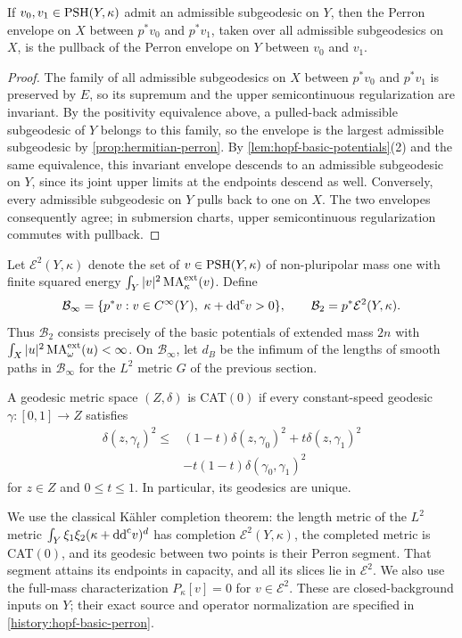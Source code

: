 \begin{proposition}\label{prop:hopf-basic-descent}
If $v_0,v_1\in\mathrm{PSH}(Y,\kappa)$ admit an admissible subgeodesic on $Y$, then the Perron envelope on $X$ between $p^*v_0$ and $p^*v_1$, taken over all admissible subgeodesics on $X$, is the pullback of the Perron envelope on $Y$ between $v_0$ and $v_1$.
\end{proposition}
\begin{proof}
The family of all admissible subgeodesics on $X$ between $p^*v_0$ and $p^*v_1$ is preserved by $E$, so its supremum and the upper semicontinuous regularization are invariant. By the positivity equivalence above, a pulled-back admissible subgeodesic of $Y$ belongs to this family, so the envelope is the largest admissible subgeodesic by \cref{prop:hermitian-perron}. By \cref{lem:hopf-basic-potentials}(2) and the same equivalence, this invariant envelope descends to an admissible subgeodesic on $Y$, since its joint upper limits at the endpoints descend as well. Conversely, every admissible subgeodesic on $Y$ pulls back to one on $X$. The two envelopes consequently agree; in submersion charts, upper semicontinuous regularization commutes with pullback.
\end{proof}

Let $\mathcal E^2(Y,\kappa)$ denote the set of $v\in\mathrm{PSH}(Y,\kappa)$ of non-pluripolar mass one with finite squared energy $\int_Y|v|^2\operatorname{MA}^{\mathrm{ext}}_\kappa(v)$. Define
\[
 \mathcal B_\infty=\{p^*v:v\in C^\infty(Y),\ \kappa+\mathrm{dd}^{\mathrm{c}} v>0\},
 \qquad
 \mathcal B_2=p^*\mathcal E^2(Y,\kappa).
\]
Thus $\mathcal B_2$ consists precisely of the basic potentials of extended mass $2n$ with $\int_X|u|^2\operatorname{MA}^{\mathrm{ext}}_\omega(u)<\infty$. On $\mathcal B_\infty$, let $d_B$ be the infimum of the lengths of smooth paths in $\mathcal B_\infty$ for the $L^2$ metric $G$ of the previous section.

A geodesic metric space $(Z,\delta)$ is CAT$(0)$ if every constant-speed geodesic $\gamma\colon[0,1]\to Z$ satisfies
\[
 \begin{aligned}
 \delta(z,\gamma_t)^2\leq{}&
 (1-t)\delta(z,\gamma_0)^2+t\delta(z,\gamma_1)^2\\
 &-t(1-t)\delta(\gamma_0,\gamma_1)^2
 \end{aligned}
\]
for $z\in Z$ and $0\leq t\leq1$. In particular, its geodesics are unique.

We use the classical K\"ahler completion theorem: the length metric of the $L^2$ metric $\int_Y\xi_1\xi_2(\kappa+\mathrm{dd}^{\mathrm{c}} v)^d$ has completion $\mathcal E^2(Y,\kappa)$, the completed metric is CAT$(0)$, and its geodesic between two points is their Perron segment. That segment attains its endpoints in capacity, and all its slices lie in $\mathcal E^2$. We also use the full-mass characterization $P_\kappa[v]=0$ for $v\in\mathcal E^2$. These are closed-background inputs on $Y$; their exact source and operator normalization are specified in \cref{history:hopf-basic-perron}.

